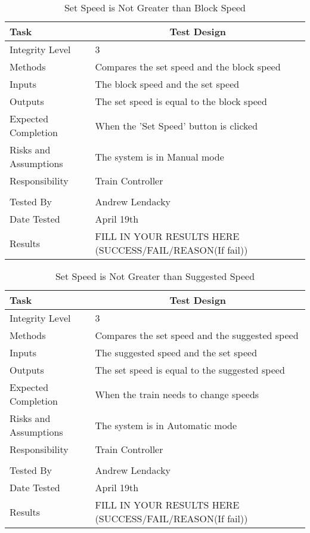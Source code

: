 \documentclass[]{article}
\begin{document}
\begin{table}[H]
	\centering
	\caption{Set Speed is Not Greater than Block Speed}
	\begin{tabular}{|l|l|}
		\hline
		Task & \multicolumn{1}{c|}{Test Design} \\ \hline
		Integrity Level & 3 \\ \hline
		Methods & Compares the set speed and the block speed\\ \hline
		Inputs & The block speed and the set speed\\ \hline
		Outputs & The set speed is equal to the block speed \\ \hline
		Expected Completion & When the 'Set Speed' button is clicked\\ \hline
		Risks and Assumptions & The system is in Manual mode\\ \hline
		Responsibility & Train Controller\\ \hline
			\\ \hline
		Tested By   &  Andrew Lendacky\\	\hline
		Date Tested & \parbox[t]{10cm}{April 19th}\\ \hline
		Results & FILL IN YOUR RESULTS HERE (SUCCESS/FAIL/REASON(If fail))\\ \hline
	\end{tabular}
\end{table}

\begin{table}[H]
	\centering
	\caption{Set Speed is Not Greater than Suggested Speed}
	\begin{tabular}{|l|l|}
		\hline
		Task & \multicolumn{1}{c|}{Test Design} \\ \hline
		Integrity Level & 3 \\ \hline
		Methods & Compares the set speed and the suggested speed\\ \hline
		Inputs & The suggested speed and the set speed\\ \hline
		Outputs & The set speed is equal to the suggested speed \\ \hline
		Expected Completion & When the train needs to change speeds\\ \hline
		Risks and Assumptions & The system is in Automatic mode \\ \hline
		Responsibility &  Train Controller\\ \hline
			\\ \hline
		Tested By   &  Andrew Lendacky\\	\hline
		Date Tested & \parbox[t]{10cm}{April 19th}\\ \hline
		Results & FILL IN YOUR RESULTS HERE (SUCCESS/FAIL/REASON(If fail))\\ \hline
	\end{tabular}
\end{table}
\end{document}

